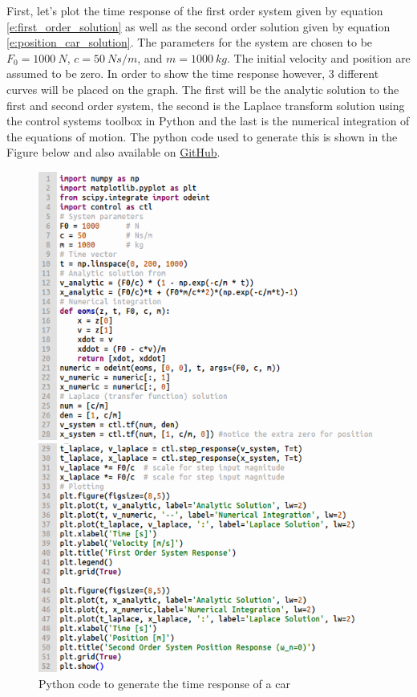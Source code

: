 First, let's plot the time response of the first order system given by equation \ref{e:first_order_solution} as well as the second order solution given by equation \ref{e:position_car_solution}. The parameters for the system are chosen to be $F_0=1000~N$, $c=50~Ns/m$, and $m=1000~kg$. The initial velocity and position are assumed to be zero. In order to show the time response however, 3 different curves will be placed on the graph. The first will be the analytic solution to the first and second order system, the second is the Laplace transform solution using the control systems toolbox in Python and the last is the numerical integration of the equations of motion. The python code used to generate this is shown in the Figure below and also available on \href{https://github.com/cmontalvo251/Python/blob/master/controls/first_order_system.py}{GitHub}.
\begin{figure}[H]
\centering
\begin{minipage}{0.48\textwidth}
\centering
\includegraphics[width=\linewidth]{Figures/car_code_1.png}
\end{minipage}\hfill
\begin{minipage}{0.48\textwidth}
\centering
\includegraphics[width=\linewidth]{Figures/car_code_2.png}
\end{minipage}
\caption{Python code to generate the time response of a car}
\label{f:car_code}
\end{figure}
